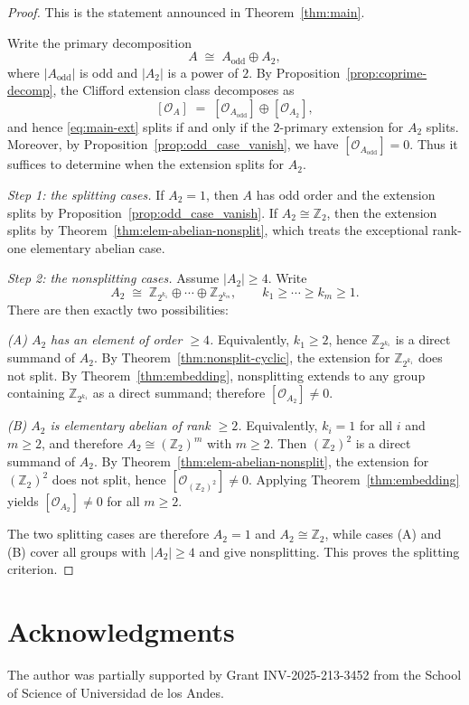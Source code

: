 \documentclass[11pt, reqno]{amsart}
\theoremstyle{definition}
\theoremstyle{remark}
\newcommand{\Z}{\mathbb{Z}}
\newcommand{\cO}{\mathcal{O}}
\begin{document}
\begin{proof}
This is the statement announced in Theorem~\ref{thm:main}.

Write the primary decomposition
\[
A \;\cong\; A_{\mathrm{odd}}\oplus A_2,
\]
where $|A_{\mathrm{odd}}|$ is odd and $|A_2|$ is a power of $2$.
By Proposition~\ref{prop:coprime-decomp}, the Clifford extension class decomposes as
\[
[\cO_A] \;=\; [\cO_{A_{\mathrm{odd}}}] \oplus [\cO_{A_2}],
\]
and hence \eqref{eq:main-ext} splits if and only if the $2$-primary extension for $A_2$ splits.
Moreover, by Proposition~\ref{prop:odd_case_vanish}, we have $[\cO_{A_{\mathrm{odd}}}]=0$.
Thus it suffices to determine when the extension splits for $A_2$.

\medskip
\noindent\textit{Step 1: the splitting cases.}
If $A_2=1$, then $A$ has odd order and the extension splits by Proposition~\ref{prop:odd_case_vanish}.
If $A_2\cong \Z_2$, then the extension splits by Theorem~\ref{thm:elem-abelian-nonsplit}, which treats the exceptional rank-one elementary abelian case.

\medskip
\noindent\textit{Step 2: the nonsplitting cases.}
Assume $|A_2| \geq 4$.
Write
\[
A_2 \;\cong\; \Z_{2^{k_1}}\oplus \cdots \oplus \Z_{2^{k_m}},
\qquad k_1\ge \cdots \ge k_m \ge 1.
\]
There are then exactly two possibilities:

\smallskip
\noindent\emph{(A) $A_2$ has an element of order $\ge4$.}
Equivalently, $k_1\ge 2$, hence $\Z_{2^{k_1}}$ is a direct summand of $A_2$.
By Theorem~\ref{thm:nonsplit-cyclic}, the extension for $\Z_{2^{k_1}}$ does not split.
By Theorem~\ref{thm:embedding}, nonsplitting extends to any group containing
$\Z_{2^{k_1}}$ as a direct summand; therefore $[\cO_{A_2}]\neq 0$.

\smallskip
\noindent\emph{(B) $A_2$ is elementary abelian of rank $\ge2$.}
Equivalently, $k_i=1$ for all $i$ and $m\ge2$, and therefore $A_2\cong (\Z_2)^m$ with $m\ge2$.
Then $(\Z_2)^2$ is a direct summand of $A_2$.
By Theorem~\ref{thm:elem-abelian-nonsplit}, the extension for $(\Z_2)^2$ does not split,
hence $[\cO_{(\Z_2)^2}]\neq 0$.
Applying Theorem~\ref{thm:embedding} yields $[\cO_{A_2}]\neq 0$ for all $m\ge2$.

\medskip
The two splitting cases are therefore $A_2=1$ and $A_2\cong \Z_2$, while cases (A) and (B) cover all groups with $|A_2|\ge 4$ and give nonsplitting. This proves the splitting criterion.
\end{proof}

\section*{Acknowledgments}
The author was partially supported by Grant INV-2025-213-3452 from the School of Science of Universidad de los Andes.







\end{document}
